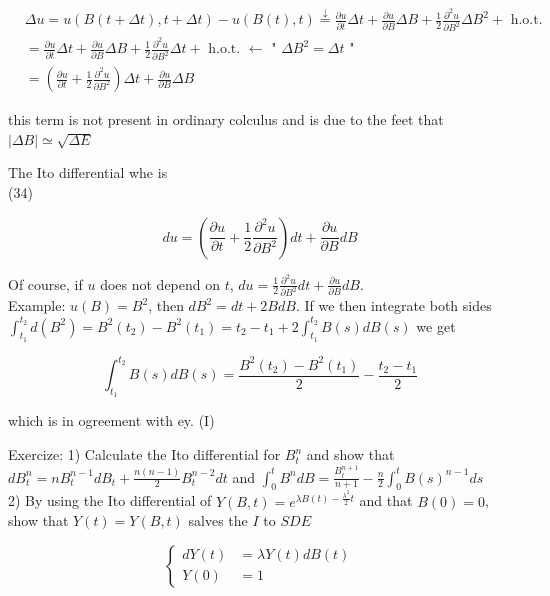 \documentclass[10pt]{article}
\begin{document}
$$
\begin{aligned}
& \Delta u=u(B(t+\Delta t), t+\Delta t)-u(B(t), t) \stackrel{\downarrow}{=} \frac{\partial u}{\partial t} \Delta t+\frac{\partial u}{\partial B} \Delta B+\frac{1}{2} \frac{\partial^{2} u}{\partial B^{2}} \Delta B^{2}+\text { h.o.t. } \\
& =\frac{\partial u}{\partial t} \Delta t+\frac{\partial u}{\partial B} \Delta B+\frac{1}{2} \frac{\partial^{2} u}{\partial B^{2}} \Delta t+\text { h.o.t. } \leftarrow \text { " } \Delta B^{2}=\Delta t \text { " } \\
& =\left(\frac{\partial u}{\partial t}+\frac{1}{2} \frac{\partial^{2} u}{\partial B^{2}}\right) \Delta t+\frac{\partial u}{\partial B} \Delta B
\end{aligned}
$$

this term is not present in ordinary colculus and is due to the feet that $|\Delta B| \simeq \sqrt{\Delta E}$

The Ito differential whe is\\
(34)

$$
d u=\left(\frac{\partial u}{\partial t}+\frac{1}{2} \frac{\partial^{2} u}{\partial B^{2}}\right) d t+\frac{\partial u}{\partial B} d B
$$

Of course, if $u$ does not depend on $t$, $d u=\frac{1}{2} \frac{\partial^{2} u}{\partial B^{2}} d t+\frac{\partial u}{\partial B} d B$.\\
Example: $u(B)=B^{2}$, then $d B^{2}=d t+2 B d B$. If we then integrate both sides $\int_{t_{1}}^{t_{2}} d\left(B^{2}\right)=B^{2}\left(t_{2}\right)-B^{2}\left(t_{1}\right)=t_{2}-t_{1}+2 \int_{t_{1}}^{t_{2}} B(s) d B(s)$ we get

$$
\int_{t_{1}}^{t_{2}} B(s) d B(s)=\frac{B^{2}\left(t_{2}\right)-B^{2}\left(t_{1}\right)}{2}-\frac{t_{2}-t_{1}}{2}
$$

which is in ogreement with ey. (I)

Exercize: 1) Calculate the Ito differential for $B_{t}^{n}$ and show that $d B_{t}^{n}=n B_{t}^{n-1} d B_{t}+\frac{n(n-1)}{2} B_{t}^{n-2} d t$ and $\int_{0}^{t} B^{n} d B=\frac{B_{t}^{n+1}}{n+1}-\frac{n}{2} \int_{0}^{t} B(s)^{n-1} d s$\\
2) By using the Ito differential of $Y(B, t)=e^{\lambda B(t)-\frac{\lambda^{2}}{2} t}$ and that $B(0)=0$, show that $Y(t)=Y(B, t)$ salves the $I$ to $S D E$

$$
\left\{\begin{aligned}
d Y(t) & =\lambda Y(t) d B(t) \\
Y(0) & =1
\end{aligned}\right.
$$
\end{document}
